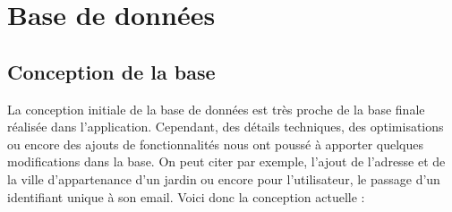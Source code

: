 \documentclass[12pt,titlepage]{report}
\begin{document}
\chapter{Base de données}

\section{Conception de la base}

La conception initiale de la base de données est très proche de la base finale réalisée dans l’application. 
Cependant, des détails techniques, des optimisations ou encore des ajouts de fonctionnalités nous ont poussé à apporter quelques modifications dans la base. On peut citer par exemple, l’ajout de l’adresse et de la ville d’appartenance d’un jardin ou encore pour l’utilisateur, le passage d’un identifiant unique à son email. Voici donc la conception actuelle : \\
\end{document}

